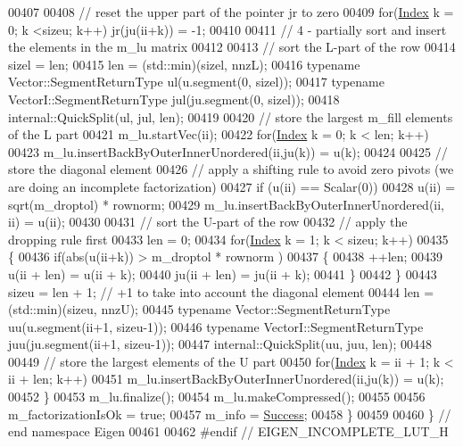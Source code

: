 \begin{DoxyCode}
00407 
00408     \textcolor{comment}{// reset the upper part of the pointer jr to zero}
00409     \textcolor{keywordflow}{for}(\hyperlink{namespace_eigen_a62e77e0933482dafde8fe197d9a2cfde}{Index} k = 0; k <sizeu; k++) jr(ju(ii+k)) = -1;
00410 
00411     \textcolor{comment}{// 4 - partially sort and insert the elements in the m\_lu matrix}
00412 
00413     \textcolor{comment}{// sort the L-part of the row}
00414     sizel = len;
00415     len = (std::min)(sizel, nnzL);
00416     \textcolor{keyword}{typename} Vector::SegmentReturnType ul(u.segment(0, sizel));
00417     \textcolor{keyword}{typename} VectorI::SegmentReturnType jul(ju.segment(0, sizel));
00418     internal::QuickSplit(ul, jul, len);
00419 
00420     \textcolor{comment}{// store the largest m\_fill elements of the L part}
00421     m\_lu.startVec(ii);
00422     \textcolor{keywordflow}{for}(\hyperlink{namespace_eigen_a62e77e0933482dafde8fe197d9a2cfde}{Index} k = 0; k < len; k++)
00423       m\_lu.insertBackByOuterInnerUnordered(ii,ju(k)) = u(k);
00424 
00425     \textcolor{comment}{// store the diagonal element}
00426     \textcolor{comment}{// apply a shifting rule to avoid zero pivots (we are doing an incomplete factorization)}
00427     \textcolor{keywordflow}{if} (u(ii) == Scalar(0))
00428       u(ii) = sqrt(m\_droptol) * rownorm;
00429     m\_lu.insertBackByOuterInnerUnordered(ii, ii) = u(ii);
00430 
00431     \textcolor{comment}{// sort the U-part of the row}
00432     \textcolor{comment}{// apply the dropping rule first}
00433     len = 0;
00434     \textcolor{keywordflow}{for}(\hyperlink{namespace_eigen_a62e77e0933482dafde8fe197d9a2cfde}{Index} k = 1; k < sizeu; k++)
00435     \{
00436       \textcolor{keywordflow}{if}(abs(u(ii+k)) > m\_droptol * rownorm )
00437       \{
00438         ++len;
00439         u(ii + len)  = u(ii + k);
00440         ju(ii + len) = ju(ii + k);
00441       \}
00442     \}
00443     sizeu = len + 1; \textcolor{comment}{// +1 to take into account the diagonal element}
00444     len = (std::min)(sizeu, nnzU);
00445     \textcolor{keyword}{typename} Vector::SegmentReturnType uu(u.segment(ii+1, sizeu-1));
00446     \textcolor{keyword}{typename} VectorI::SegmentReturnType juu(ju.segment(ii+1, sizeu-1));
00447     internal::QuickSplit(uu, juu, len);
00448 
00449     \textcolor{comment}{// store the largest elements of the U part}
00450     \textcolor{keywordflow}{for}(\hyperlink{namespace_eigen_a62e77e0933482dafde8fe197d9a2cfde}{Index} k = ii + 1; k < ii + len; k++)
00451       m\_lu.insertBackByOuterInnerUnordered(ii,ju(k)) = u(k);
00452   \}
00453   m\_lu.finalize();
00454   m\_lu.makeCompressed();
00455 
00456   m\_factorizationIsOk = \textcolor{keyword}{true};
00457   m\_info = \hyperlink{group__enums_gga85fad7b87587764e5cf6b513a9e0ee5ea52581b035f4b59c203b8ff999ef5fcea}{Success};
00458 \}
00459 
00460 \} \textcolor{comment}{// end namespace Eigen}
00461 
00462 \textcolor{preprocessor}{#endif // EIGEN\_INCOMPLETE\_LUT\_H}
\end{DoxyCode}
